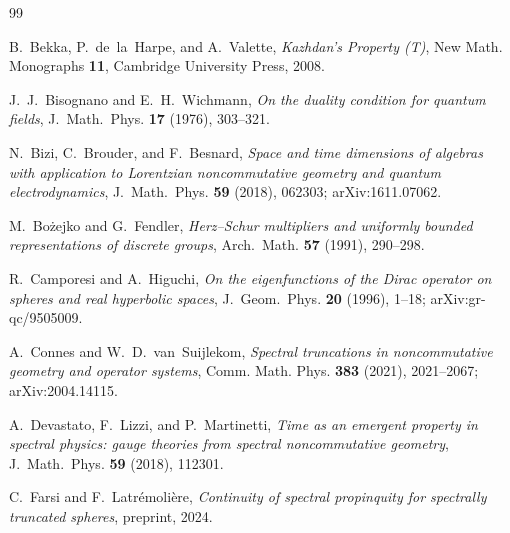 \documentclass[11pt,a4paper]{article}
\theoremstyle{plain}
\theoremstyle{definition}
\begin{document}
\begin{thebibliography}{99}

B.~Bekka, P.~de~la~Harpe, and A.~Valette,
\newblock \emph{Kazhdan's Property (T)},
\newblock New Math. Monographs \textbf{11}, Cambridge University Press, 2008.

J.~J.~Bisognano and E.~H.~Wichmann,
\newblock \emph{On the duality condition for quantum fields},
\newblock J.~Math.~Phys. \textbf{17} (1976), 303--321.

N.~Bizi, C.~Brouder, and F.~Besnard,
\newblock \emph{Space and time dimensions of algebras with application
to Lorentzian noncommutative geometry and quantum electrodynamics},
\newblock J.~Math.~Phys. \textbf{59} (2018), 062303;
\newblock arXiv:1611.07062.

M.~Bo\.zejko and G.~Fendler,
\newblock \emph{Herz--Schur multipliers and uniformly bounded
representations of discrete groups},
\newblock Arch.~Math. \textbf{57} (1991), 290--298.

R.~Camporesi and A.~Higuchi,
\newblock \emph{On the eigenfunctions of the Dirac operator on spheres
and real hyperbolic spaces},
\newblock J.~Geom.~Phys. \textbf{20} (1996), 1--18;
\newblock arXiv:gr-qc/9505009.

A.~Connes and W.~D.~van~Suijlekom,
\newblock \emph{Spectral truncations in noncommutative geometry and
operator systems},
\newblock Comm. Math. Phys. \textbf{383} (2021), 2021--2067;
\newblock arXiv:2004.14115.

A.~Devastato, F.~Lizzi, and P.~Martinetti,
\newblock \emph{Time as an emergent property in spectral physics:
gauge theories from spectral noncommutative geometry},
\newblock J.~Math.~Phys. \textbf{59} (2018), 112301.

C.~Farsi and F.~Latr\'emoli\`ere,
\newblock \emph{Continuity of spectral propinquity for spectrally
truncated spheres},
\newblock preprint, 2024.


\end{thebibliography}
\end{document}
